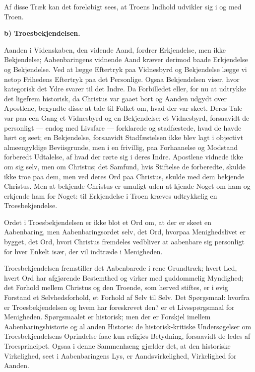 \documentclass[12pt]{book}
\newcommand{\runhead}[1]{%
  \medskip\begin{center}{\bfseries #1}\end{center}\medskip}
\begin{document}
Af disse Træk kan det foreløbigt sees, at Troens Indhold udvikler
sig i og med Troen.
\runhead{b) Troesbekjendelsen.}

Aanden i Videnskaben, den vidende Aand, fordrer Erkjendelse, men
ikke Bekjendelse; Aabenbaringens vidnende Aand kræver derimod baade
Erkjendelse og Bekjendelse. Ved at lægge Eftertryk paa Vidnesbyrd og
Bekjendelse lægge vi netop Frihedens Eftertryk paa det Personlige.
Ogsaa Bekjendelsen viser, hvor kategorisk det Ydre svarer til det
Indre. Da Forbilledet eller, for nu at udtrykke det ligefrem
historisk, da Christus var gaaet bort og Aanden udgydt over
Apostlene, begyndte disse at tale til Folket om, hvad der var skeet.
Deres Tale var paa een Gang et Vidnesbyrd og en Bekjendelse; et
Vidnesbyrd, forsaavidt de personligt --- endog med Livsfare ---
forklarede og stadfæstede, hvad de havde hørt og seet; en
Bekjendelse, forsaavidt Stadfæstelsen ikke blev lagt i objectivt
almeengyldige Beviisgrunde, men i en frivillig, paa Forhaanelse og
Modstand forberedt Udtalelse, af hvad der rørte sig i deres Indre.
Apostlene vidnede ikke om sig selv, men om Christus; det Samfund,
hvis Stiftelse de forberedte, skulde ikke troe paa dem, men ved
deres Ord paa Christus, skulde med dem bekjende Christus. Men at
bekjende Christus er umuligt uden at kjende Noget om ham og erkjende
ham for Noget: til Erkjendelse i Troen kræves udtrykkelig en
Troesbekjendelse.

Ordet i Troesbekjendelsen er ikke blot et Ord om, at der er skeet en
Aabenbaring, men Aabenbaringsordet selv, det Ord, hvorpaa
Menighedslivet er bygget, det Ord, hvori Christus fremdeles vedbliver
at aabenbare sig personligt for hver Enkelt især, der vil indtræde i
Menigheden.

Troesbekjendelsen fremstiller det Aabenbarede i rene Grundtræk;
hvert Led, hvert Ord har afgjørende Bestemthed og virker med
guddommelig Myndighed; det
Forhold mellem Christus og den Troende, som herved stiftes, er i
evig Forstand et Selvhedsforhold, et Forhold af Selv til Selv. Det
Spørgsmaal: hvorfra er Troesbekjendelsen og hvem har foreskrevet
den? er et Livsspørgsmaal for Menigheden. Spørgsmaalet er historisk;
men der er Forskjel imellem Aabenbaringshistorie og al anden
Historie: de historisk-kritiske Undersøgelser om Troesbekjendelsens
Oprindelse faae kun religiøs Betydning, forsaavidt de ledes af
Troesprincipet. Ogsaa i denne Sammenhæng gjælder det, at den
historiske Virkelighed, seet i Aabenbaringens Lys, er
Aandsvirkelighed, Virkelighed for Aanden.
\end{document}
